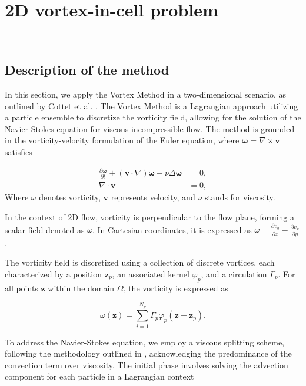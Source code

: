 
\section{2D vortex-in-cell problem}~\label{App_2D}
\subsection{Description of the method}


In this section, we apply the Vortex Method in a two-dimensional scenario, as outlined by Cottet et al. \cite{cottet_vortex_2000}. The Vortex Method is a Lagrangian approach utilizing a particle ensemble to discretize the vorticity field, allowing for the solution of the Navier-Stokes equation for viscous incompressible flow. The method is grounded in the vorticity-velocity formulation of the Euler equation, where $\bm \omega = \nabla \times \bm{v}$ satisfies

\[
	\begin{aligned}
		\frac{\partial \bm \omega}{\partial t} + (\bm{v} \cdot \nabla) \bm \omega - \nu \Delta \bm \omega & = 0, \\
		\nabla \cdot \bm v                                                                                & = 0,
	\end{aligned}
\]Where $\omega$ denotes vorticity, $\bm{v}$ represents velocity, and $\nu$ stands for viscosity.

In the context of 2D flow, vorticity is perpendicular to the flow plane, forming a scalar field denoted as $\omega$. In Cartesian coordinates, it is expressed as $\omega = \frac{\partial v_y}{\partial x} - \frac{\partial v_x}{\partial y}$.

The vorticity field is discretized using a collection of discrete vortices, each characterized by a position $\bm z_p$, an associated kernel $\varphi_p$, and a circulation $\Gamma_p$. For all points $\bm z$ within the domain $\Omega$, the vorticity is expressed as

\begin{equation*}
	\omega(\bm z) = \sum_{i=1}^{N_p} \Gamma_p \varphi_p(\bm z - \bm z_p).
\end{equation*}

To address the Navier-Stokes equation, we employ a viscous splitting scheme, following the methodology outlined in \cite{cottet_1990}, acknowledging the predominance of the convection term over viscosity. The initial phase involves solving the advection component for each particle in a Lagrangian context

